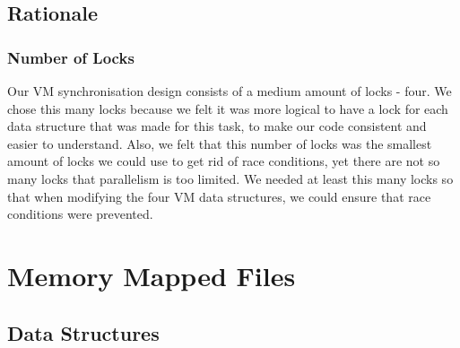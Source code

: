 \documentclass{article}
\renewcommand{\_}{\char`_}
\begin{document}
\subsection{Rationale}

\subsubsection{Number of Locks}

Our VM synchronisation design consists of a medium amount of locks - four. We chose this many locks because we felt it was more logical to have a lock for each data structure that was made for this task, to make our code consistent and easier to understand. Also, we felt that this number of locks was the smallest amount of locks we could use to get rid of race conditions, yet there are not so many locks that parallelism is too limited. We needed at least this many locks so that when modifying the four VM data structures, we could ensure that race conditions were prevented.

\section{Memory Mapped Files}

\subsection{Data Structures}
\end{document}
